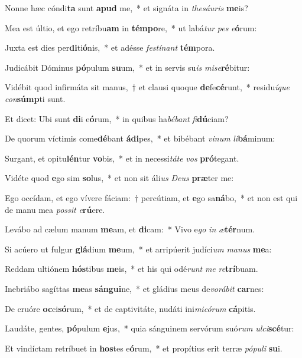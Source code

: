 \item Nonne hæc cóndi\textbf{ta} sunt \textbf{a}\textbf{pud} me,~* et signáta in \textit{the}\textit{sáu}\textit{ris} \textbf{me}is?
\item Mea est últio, et ego retríbu\textbf{am} in \textbf{tém}\textbf{po}re,~* ut labá\textit{tur} \textit{pes} \textit{e}\textbf{ó}rum:
\item Juxta est dies per\textbf{di}ti\textbf{ó}nis,~* et adésse \textit{fes}\textit{tí}\textit{nant} \textbf{tém}pora.
\item Judicábit Dóminus \textbf{pó}pulum \textbf{su}um,~* et in servis su\textit{is} \textit{mi}\textit{se}\textbf{ré}bitur:
\item Vidébit quod infirmáta sit manus,~† et clausi quoque \textbf{de}fe\textbf{cé}runt,~* residu\textit{í}\textit{que} \textit{con}\textbf{súmp}ti sunt.
\item Et dicet: Ubi sunt \textbf{di}i e\textbf{ó}rum,~* in quibus ha\textit{bé}\textit{bant} \textit{fi}\textbf{dú}ciam?
\item De quorum víctimis come\textbf{dé}bant \textbf{á}\textbf{di}pes,~* et bibébant \textit{vi}\textit{num} \textit{li}\textbf{bá}minum:
\item Surgant, et opitu\textbf{lén}tur \textbf{vo}bis,~* et in necessi\textit{tá}\textit{te} \textit{vos} \textbf{pró}tegant.
\item Vidéte quod \textbf{e}go sim \textbf{so}lus,~* et non sit áli\textit{us} \textit{De}\textit{us} \textbf{præ}ter me:
\item Ego occídam, et ego vívere fáciam:~† percútiam, et \textbf{e}go sa\textbf{ná}bo,~* et non est qui de manu mea \textit{pos}\textit{sit} \textit{e}\textbf{rú}ere.
\item Levábo ad cælum manum \textbf{me}am, et \textbf{di}cam:~* Vivo e\textit{go} \textit{in} \textit{æ}\textbf{tér}num.
\item Si acúero ut fulgur \textbf{glá}dium \textbf{me}um,~* et arripúerit judíci\textit{um} \textit{ma}\textit{nus} \textbf{me}a:
\item Reddam ultiónem \textbf{hós}tibus \textbf{me}is,~* et his qui odé\textit{runt} \textit{me} \textit{re}\textbf{trí}buam.
\item Inebriábo sagíttas \textbf{me}as \textbf{sán}\textbf{gui}ne,~* et gládius meus de\textit{vo}\textit{rá}\textit{bit} \textbf{car}nes:
\item De cruóre \textbf{oc}ci\textbf{só}rum,~* et de captivitáte, nudáti ini\textit{mi}\textit{có}\textit{rum} \textbf{cá}pitis.
\item Laudáte, gentes, \textbf{pó}pulum \textbf{e}jus,~* quia sánguinem servórum suó\textit{rum} \textit{ul}\textit{ci}\textbf{scé}tur:
\item Et vindíctam retríbuet in \textbf{hos}tes e\textbf{ó}rum,~* et propítius erit terræ \textit{pó}\textit{pu}\textit{li} \textbf{su}i.
